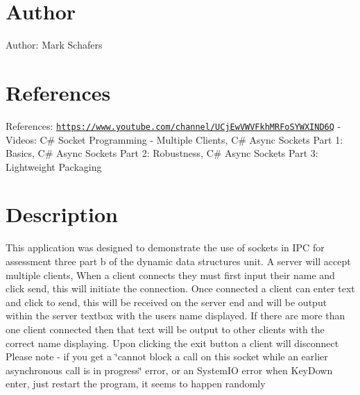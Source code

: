 \hypertarget{index_author_sec}{}\section{Author}\label{index_author_sec}
Author\+: Mark Schafers\hypertarget{index_reference_sec}{}\section{References}\label{index_reference_sec}
References\+: \href{https://www.youtube.com/channel/UCjEwVWVFkhMRFoSYWXIND6Q}{\tt https\+://www.\+youtube.\+com/channel/\+U\+Cj\+Ew\+V\+W\+V\+Fkh\+M\+R\+Fo\+S\+Y\+W\+X\+I\+N\+D6Q} -\/ Videos\+: C\# Socket Programming -\/ Multiple Clients, C\# Async Sockets Part 1\+: Basics, C\# Async Sockets Part 2\+: Robustness, C\# Async Sockets Part 3\+: Lightweight Packaging\hypertarget{index_description_sec}{}\section{Description}\label{index_description_sec}
This application was designed to demonstrate the use of sockets in I\+PC for assessment three part b of the dynamic data structures unit. A server will accept multiple clients, When a client connects they must first input their name and click send, this will initiate the connection. Once connected a client can enter text and click to send, this will be received on the server end and will be output within the server textbox with the users name displayed. If there are more than one client connected then that text will be output to other clients with the correct name displaying. Upon clicking the exit button a client will disconnect Please note -\/ if you get a \char`\"{}cannot block a call on this socket while an earlier asynchronous call is in progress\char`\"{} error, or an System\+IO error when Key\+Down enter, just restart the program, it seems to happen randomly 